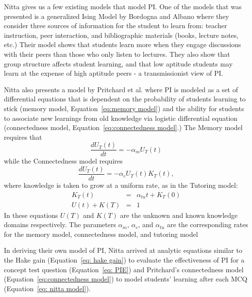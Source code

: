 \documentclass[twocolumn,secnumarabic,amssymb, nobibnotes, aps, prd]{revtex4-2}
\begin{document}
    Nitta \cite{nitta2019mathematical} gives us a few existing models that model PI. 
    One of the models that was presented is a generalized Ising Model by Bordogna and Albano \cite{bordogna2001theoretical,bordogna2003simulation} where they consider three sources of information for the student to learn from: teacher instruction, peer interaction, and bibliographic materials (books, lecture notes, etc.)
    Their model shows that students learn more when they engage discussions with their peers than those who only listen to lectures.
    They also show that group structure affects student learning, and that low aptitude students may learn at the expense of high aptitude peers - a transmissionist view of PI.

    Nitta also presents a model by Pritchard et al. \cite{pritchard2008mathematical} where PI is modeled as a set of differential equations that is dependent on the probability of students learning to stick (memory model, Equation~\ref{eq:memory model}) and the ability for students to associate new learnings from old knowledge via logistic differential equation (connectedness model, Equation~\ref{eq:connectedness model}.)
    The Memory model requires that
    \begin{equation}
        \label{eq:memory model}
        \frac{dU_T(t)}{dt} = -\alpha_m U_T(t)
    \end{equation}
    while the Connectedness model requires
    \begin{equation}
        \label{eq:connectedness model}
        \frac{dU_T(t)}{dt} = -\alpha_c U_T(t)K_T(t),
    \end{equation}
    where knowledge is taken to grow at a uniform rate, as in the Tutoring model:
    \begin{eqnarray}
        K_T(t) &=& \alpha_{tu}t + K_T(0) \label{eq:tutoring model} \\
        U(t) + K(T) &=& 1
    \end{eqnarray}
    In these equations $U(T)$ and $K(T)$ are the unknown and known knowledge domains respectively.
    The parameters $\alpha_m$, $\alpha_c$, and $\alpha_{tu}$ are the corresponding rates for the memory model, connectedness model, and tutoring model 

    In deriving their own model of PI, Nitta arrived at analytic equations similar to the Hake gain (Equation~\ref{eq: hake gain}) to evaluate the effectiveness of PI for a concept test question (Equation~\ref{eq: PIE}) and Pritchard's connectedness model (Equation~\ref{eq:connectedness model}) to model students' learning after each MCQ (Equation~\ref{eq: nitta model}).
\end{document}
